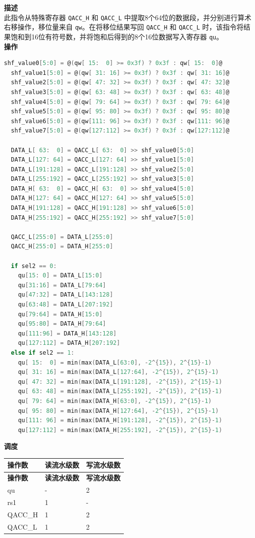 \textbf{描述}\\
此指令从特殊寄存器 \lstinline{QACC_H} 和 \lstinline{QACC_L} 中提取8个64位的数据段，并分别进行算术右移操作，移位量来自 \lstinline{qw}。在将移位结果写回 \lstinline{QACC_H} 和 \lstinline{QACC_L} 时，该指令将结果饱和到16位有符号数，并将饱和后得到的8个16位数据写入寄存器 \lstinline{qu}。\\
\textbf{操作}
\begin{lstlisting}[language=C, escapechar=@]
  shf_value0[5:0] = @(qw[ 15:  0] >= 0x3f) ? 0x3f : qw[ 15:  0]@
  shf_value1[5:0] = @(qw[ 31: 16] >= 0x3f) ? 0x3f : qw[ 31: 16]@
  shf_value2[5:0] = @(qw[ 47: 32] >= 0x3f) ? 0x3f : qw[ 47: 32]@
  shf_value3[5:0] = @(qw[ 63: 48] >= 0x3f) ? 0x3f : qw[ 63: 48]@
  shf_value4[5:0] = @(qw[ 79: 64] >= 0x3f) ? 0x3f : qw[ 79: 64]@
  shf_value5[5:0] = @(qw[ 95: 80] >= 0x3f) ? 0x3f : qw[ 95: 80]@
  shf_value6[5:0] = @(qw[111: 96] >= 0x3f) ? 0x3f : qw[111: 96]@
  shf_value7[5:0] = @(qw[127:112] >= 0x3f) ? 0x3f : qw[127:112]@

  DATA_L[ 63:  0] = QACC_L[ 63:  0] >> shf_value0[5:0]
  DATA_L[127: 64] = QACC_L[127: 64] >> shf_value1[5:0]
  DATA_L[191:128] = QACC_L[191:128] >> shf_value2[5:0]
  DATA_L[255:192] = QACC_L[255:192] >> shf_value3[5:0]
  DATA_H[ 63:  0] = QACC_H[ 63:  0] >> shf_value4[5:0]
  DATA_H[127: 64] = QACC_H[127: 64] >> shf_value5[5:0]
  DATA_H[191:128] = QACC_H[191:128] >> shf_value6[5:0]
  DATA_H[255:192] = QACC_H[255:192] >> shf_value7[5:0]

  QACC_L[255:0] = DATA_L[255:0]
  QACC_H[255:0] = DATA_H[255:0]

  if sel2 == 0:
    qu[15: 0] = DATA_L[15:0]
    qu[31:16] = DATA_L[79:64]
    qu[47:32] = DATA_L[143:128]
    qu[63:48] = DATA_L[207:192]
    qu[79:64] = DATA_H[15:0]
    qu[95:80] = DATA_H[79:64]
    qu[111:96] = DATA_H[143:128]
    qu[127:112] = DATA_H[207:192]
  else if sel2 == 1:
    qu[ 15:  0] = min(max(DATA_L[63:0], -2^{15}), 2^{15}-1)
    qu[ 31: 16] = min(max(DATA_L[127:64], -2^{15}), 2^{15}-1)
    qu[ 47: 32] = min(max(DATA_L[191:128], -2^{15}), 2^{15}-1)
    qu[ 63: 48] = min(max(DATA_L[255:192], -2^{15}), 2^{15}-1)
    qu[ 79: 64] = min(max(DATA_H[63:0], -2^{15}), 2^{15}-1)
    qu[ 95: 80] = min(max(DATA_H[127:64], -2^{15}), 2^{15}-1)
    qu[111: 96] = min(max(DATA_H[191:128], -2^{15}), 2^{15}-1)
    qu[127:112] = min(max(DATA_H[255:192], -2^{15}), 2^{15}-1)
\end{lstlisting}

\textbf{调度}\\
\begin{longtable}[c]{|l|l|l|}
    \hline
    \rowcolor{lightgray}
    \textbf{操作数} & \textbf{读流水级数} & \textbf{写流水级数} \\\hline
    \endfirsthead
    \hline
    \rowcolor{lightgray}
     \textbf{操作数} & \textbf{读流水级数} & \textbf{写流水级数} \\\hline
    \endhead
    \hline
    \endfoot

  qu & - & 2 \\\hline
  rs1 & 1 & - \\\hline
  QACC\_H & 1 & 2 \\\hline
  QACC\_L & 1 & 2

\end{longtable}

